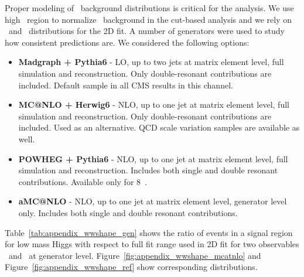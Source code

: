 Proper modeling of \ww\ background distributions is critical for the
analysis. We use high \mll\ region to normalize \ww\ background in the
cut-based analysis and we rely on \mll\ and \mt\ distributions for the
2D fit. A number of generators were used to study how consistent
predictions are. We considered the following options:
\begin{itemize}
    \item {\bf Madgraph + Pythia6} - LO, up to two jets at matrix element level,
    full simulation and reconstruction. Only double-resonant
    contributions are included. Default sample in all CMS results in
    this channel.

    \item {\bf MC@NLO + Herwig6} - NLO, up to one jet at matrix element level,
    full simulation and reconstruction. Only double-resonant
    contributions are included. Used as an alternative. QCD scale
    variation samples are available as well.

    \item {\bf POWHEG + Pythia6} - NLO, up to one jet at matrix element level,
    full simulation and reconstruction. Includes both single and
    double resonant contributions. Available only for 8~\TeV{}.

    \item {\bf aMC@NLO} - NLO, up to one jet at matrix element level,
    generator level only. Includes both single and double resonant
    contributions.
\end{itemize}

Table~\ref{tab:appendix_wwshape_gen} shows the ratio of events in a
signal region for low mass Higgs with respect to full fit range used
in 2D fit for two observables \mll\ and \mt\ at generator
level. Figure~\ref{fig:appendix_wwshape_mcatnlo} and
Figure~\ref{fig:appendix_wwshape_ref} show corresponding
distributions.


